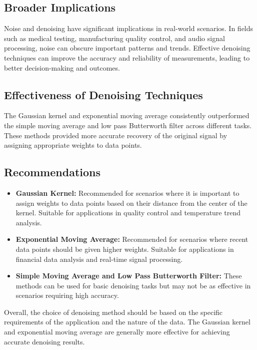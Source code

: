 \documentclass[a4paper,12pt]{article} %
\begin{document}
\subsection*{Broader Implications}
Noise and denoising have significant implications in real-world scenarios. In fields such as medical testing, manufacturing quality control, and audio signal processing, noise can obscure important patterns and trends. Effective denoising techniques can improve the accuracy and reliability of measurements, leading to better decision-making and outcomes.

\subsection*{Effectiveness of Denoising Techniques}
The Gaussian kernel and exponential moving average consistently outperformed the simple moving average and low pass Butterworth filter across different tasks. These methods provided more accurate recovery of the original signal by assigning appropriate weights to data points.

\subsection*{Recommendations}
\begin{itemize}
    \item \textbf{Gaussian Kernel:} Recommended for scenarios where it is important to assign weights to data points based on their distance from the center of the kernel. Suitable for applications in quality control and temperature trend analysis.
    \item \textbf{Exponential Moving Average:} Recommended for scenarios where recent data points should be given higher weights. Suitable for applications in financial data analysis and real-time signal processing.
    \item \textbf{Simple Moving Average and Low Pass Butterworth Filter:} These methods can be used for basic denoising tasks but may not be as effective in scenarios requiring high accuracy.
\end{itemize}

Overall, the choice of denoising method should be based on the specific requirements of the application and the nature of the data. The Gaussian kernel and exponential moving average are generally more effective for achieving accurate denoising results.
\end{document}
